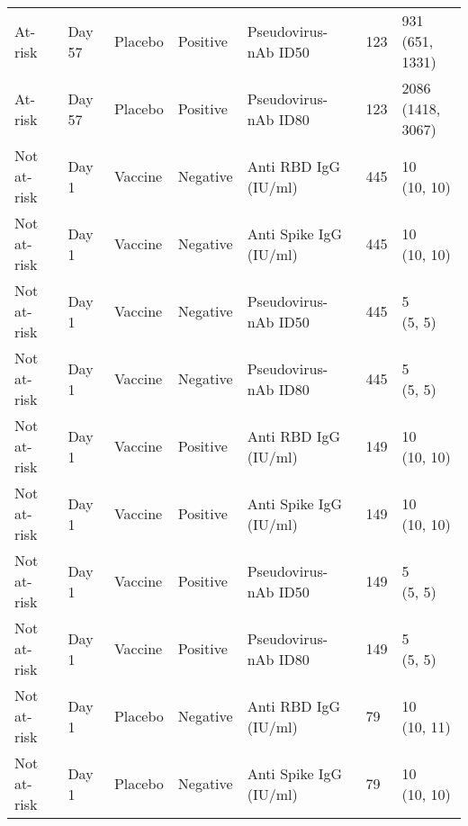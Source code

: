 \documentclass[]{book}
\theoremstyle{definition}
\theoremstyle{definition}
\theoremstyle{definition}
\newcommand{\1}{\mathbbm{1}}
\begin{document}
\begin{landscape}
\begin{ThreePartTable}
\begin{longtable}[t]{>{\raggedright\arraybackslash}p{7cm}llllll}
\hspace{1em}At-risk & Day 57 & Placebo & Positive & Pseudovirus-nAb ID50 & 123 & \makecell[l]{931\\(651, 1331)}\\
\hspace{1em}At-risk & Day 57 & Placebo & Positive & Pseudovirus-nAb ID80 & 123 & \makecell[l]{2086\\(1418, 3067)}\\
\hspace{1em}Not at-risk & Day 1 & Vaccine & Negative & Anti RBD IgG (IU/ml) & 445 & \makecell[l]{10\\(10, 10)}\\
\hspace{1em}Not at-risk & Day 1 & Vaccine & Negative & Anti Spike IgG (IU/ml) & 445 & \makecell[l]{10\\(10, 10)}\\
\hspace{1em}Not at-risk & Day 1 & Vaccine & Negative & Pseudovirus-nAb ID50 & 445 & \makecell[l]{5\\(5, 5)}\\
\hspace{1em}Not at-risk & Day 1 & Vaccine & Negative & Pseudovirus-nAb ID80 & 445 & \makecell[l]{5\\(5, 5)}\\
\hspace{1em}Not at-risk & Day 1 & Vaccine & Positive & Anti RBD IgG (IU/ml) & 149 & \makecell[l]{10\\(10, 10)}\\
\hspace{1em}Not at-risk & Day 1 & Vaccine & Positive & Anti Spike IgG (IU/ml) & 149 & \makecell[l]{10\\(10, 10)}\\
\hspace{1em}Not at-risk & Day 1 & Vaccine & Positive & Pseudovirus-nAb ID50 & 149 & \makecell[l]{5\\(5, 5)}\\
\hspace{1em}Not at-risk & Day 1 & Vaccine & Positive & Pseudovirus-nAb ID80 & 149 & \makecell[l]{5\\(5, 5)}\\
\hspace{1em}Not at-risk & Day 1 & Placebo & Negative & Anti RBD IgG (IU/ml) & 79 & \makecell[l]{10\\(10, 11)}\\
\hspace{1em}Not at-risk & Day 1 & Placebo & Negative & Anti Spike IgG (IU/ml) & 79 & \makecell[l]{10\\(10, 10)}\\

\end{longtable}
\end{ThreePartTable}
\end{landscape}
\end{document}
